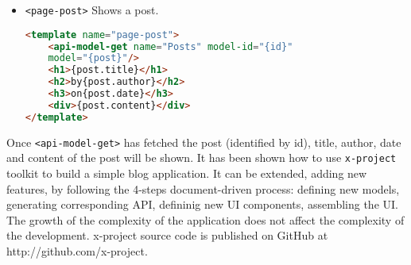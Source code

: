 \begin{itemize} \item \texttt{<page-post>} Shows a post.
\begin{lstlisting}[language=html]
<template name="page-post">
	<api-model-get name="Posts" model-id="{id}"
	model="{post}"/>
	<h1>{post.title}</h1>
	<h2>by{post.author}</h2>
	<h3>on{post.date}</h3>
	<div>{post.content}</div>
</template>
\end{lstlisting}
\end{itemize}

Once \texttt{<api-model-get>} has fetched the post (identified by id), title, author, date and content of the post will be shown. It has been shown how to use \texttt{x-project} toolkit to build a simple blog application. It can be extended, adding new features, by following the 4-steps document-driven process: defining new models, generating corresponding API, defininig new UI components, assembling the UI. The growth of the complexity of the application does not affect the complexity of the development. x-project source code is published on GitHub at http://github.com/x-project.

